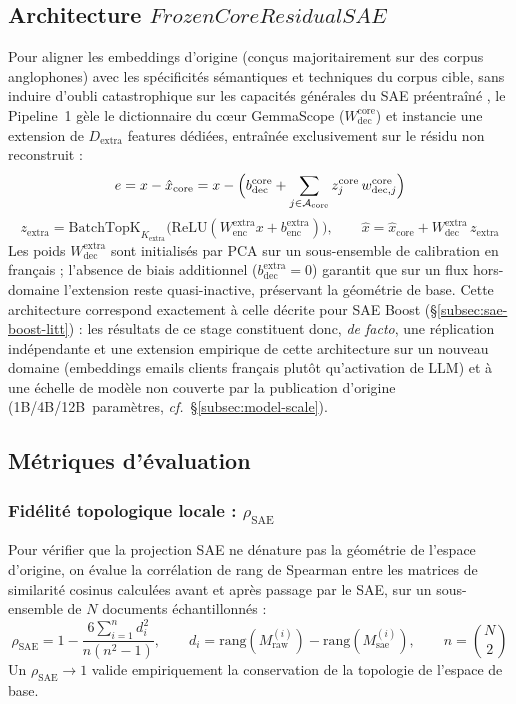 \documentclass[11pt]{article}
\begin{document}
\subsection{Architecture \texorpdfstring{$\textit{FrozenCoreResidualSAE}$}{FrozenCoreResidualSAE}}
\label{subsec:frozencore}

Pour aligner les embeddings d'origine (conçus majoritairement sur des corpus
anglophones) avec les spécificités sémantiques et techniques du corpus cible,
sans induire d'oubli catastrophique sur les capacités générales du SAE
préentraîné \cite{lieberum2024gemmascope}, le Pipeline~1 gèle le dictionnaire du cœur GemmaScope
($W_\text{dec}^\text{core}$) et instancie une extension de $D_\text{extra}$
features dédiées, entraînée exclusivement sur le résidu non reconstruit :
\[
  e = x - \hat{x}_\text{core} = x - \Bigl(b_\text{dec}^\text{core} +
  \sum_{j \in \mathcal{A}_\text{core}} z_j^\text{core}\, w_{\text{dec},j}^\text{core}\Bigr)
\]
\[
  z_\text{extra} = \text{BatchTopK}_{K_\text{extra}}\bigl(\text{ReLU}(W_\text{enc}^\text{extra} x + b_\text{enc}^\text{extra})\bigr), \qquad
  \hat{x} = \hat{x}_\text{core} + W_\text{dec}^\text{extra}\, z_\text{extra}
\]
Les poids $W_\text{dec}^\text{extra}$ sont initialisés par PCA sur un
sous-ensemble de calibration en français ; l'absence de biais additionnel
($b_\text{dec}^\text{extra}=0$) garantit que sur un flux hors-domaine
l'extension reste quasi-inactive, préservant la géométrie de base. Cette
architecture correspond exactement à celle décrite pour SAE Boost
(\S\ref{subsec:sae-boost-litt}) : les résultats de ce stage constituent donc,
\emph{de facto}, une réplication indépendante et une extension empirique de
cette architecture sur un nouveau domaine (embeddings emails clients français plutôt qu'activation de LLM) et à une
échelle de modèle non couverte par la publication d'origine
(1B/4B/12B~paramètres, \emph{cf.}~\S\ref{subsec:model-scale}).

\subsection{Métriques d'évaluation}

\subsubsection{Fidélité topologique locale : \texorpdfstring{$\rho_\text{SAE}$}{rho\_SAE}}
Pour vérifier que la projection SAE ne dénature pas la géométrie de l'espace
d'origine, on évalue la corrélation de rang de Spearman entre les matrices de
similarité cosinus calculées avant et après passage par le SAE, sur un
sous-ensemble de $N$ documents échantillonnés :
\[
  \rho_\text{SAE} = 1 - \frac{6\sum_{i=1}^n d_i^2}{n(n^2-1)}, \qquad
  d_i = \text{rang}(M_\text{raw}^{(i)}) - \text{rang}(M_\text{sae}^{(i)}), \qquad
  n = \binom{N}{2}
\]
Un $\rho_\text{SAE} \to 1$ valide empiriquement la conservation de la
topologie de l'espace de base.
\end{document}
